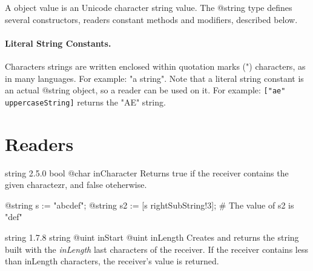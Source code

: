 

A  object value is an Unicode character string value. The @string type defines several constructors, readers constant methods and modifiers, described below.

\paragraph{Literal String Constants.}

Characters strings are written enclosed within quotation marks (") characters, as in many languages. For example: "a string". Note that a literal string constant is an actual @string object, so a reader can be used on it. For example: \lstinline[language=galgas]{["ae" uppercaseString]} returns the "AE" string.

\section{Readers}

{string}
{2.5.0}
{bool}
{@char inCharacter}
{Returns true if the receiver contains the given charactezr, and false oteherwise.}
{}

\begin{galgascode}
@string s := "abcdef";
@string s2 := [s rightSubString!3]; # The value of s2 is "def"
\end{galgascode}

{string}
{1.7.8}
{string}
{@uint inStart}
{@uint inLength}
{Creates and returns the string built with the \emph{inLength} last characters of the receiver. If the receiver contains less than inLength characters, the receiver’s value is returned.}
{}


